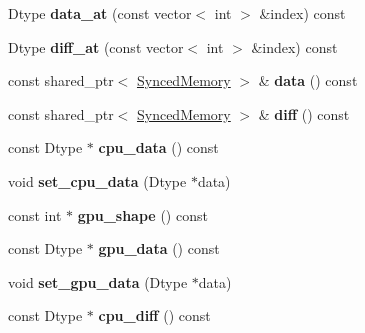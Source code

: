 \begin{DoxyCompactItemize}
\item 
Dtype {\bfseries data\+\_\+at} (const vector$<$ int $>$ \&index) const \hypertarget{classcaffe_1_1Blob_a85a566849633e35492a3dc41d9551731}{}\label{classcaffe_1_1Blob_a85a566849633e35492a3dc41d9551731}

\item 
Dtype {\bfseries diff\+\_\+at} (const vector$<$ int $>$ \&index) const \hypertarget{classcaffe_1_1Blob_ab783abf65ca66df623a8a373de65209b}{}\label{classcaffe_1_1Blob_ab783abf65ca66df623a8a373de65209b}

\item 
const shared\+\_\+ptr$<$ \hyperlink{classcaffe_1_1SyncedMemory}{Synced\+Memory} $>$ \& {\bfseries data} () const \hypertarget{classcaffe_1_1Blob_a09d1435056f21ba9df52cee4d6371087}{}\label{classcaffe_1_1Blob_a09d1435056f21ba9df52cee4d6371087}

\item 
const shared\+\_\+ptr$<$ \hyperlink{classcaffe_1_1SyncedMemory}{Synced\+Memory} $>$ \& {\bfseries diff} () const \hypertarget{classcaffe_1_1Blob_ab7a8c2034a34695fe5f777ff3271e80d}{}\label{classcaffe_1_1Blob_ab7a8c2034a34695fe5f777ff3271e80d}

\item 
const Dtype $\ast$ {\bfseries cpu\+\_\+data} () const \hypertarget{classcaffe_1_1Blob_a490e0b609d0d62dbfc317cbe76aa8fa2}{}\label{classcaffe_1_1Blob_a490e0b609d0d62dbfc317cbe76aa8fa2}

\item 
void {\bfseries set\+\_\+cpu\+\_\+data} (Dtype $\ast$data)\hypertarget{classcaffe_1_1Blob_a5d7d38b157e43ff6a8b8bf94b6815daf}{}\label{classcaffe_1_1Blob_a5d7d38b157e43ff6a8b8bf94b6815daf}

\item 
const int $\ast$ {\bfseries gpu\+\_\+shape} () const \hypertarget{classcaffe_1_1Blob_a16e82cd29e919b116cc8e08af451ab11}{}\label{classcaffe_1_1Blob_a16e82cd29e919b116cc8e08af451ab11}

\item 
const Dtype $\ast$ {\bfseries gpu\+\_\+data} () const \hypertarget{classcaffe_1_1Blob_afd60f6fa2044997149075817991bfc19}{}\label{classcaffe_1_1Blob_afd60f6fa2044997149075817991bfc19}

\item 
void {\bfseries set\+\_\+gpu\+\_\+data} (Dtype $\ast$data)\hypertarget{classcaffe_1_1Blob_ad350de479e172e963f02e8332c800bb7}{}\label{classcaffe_1_1Blob_ad350de479e172e963f02e8332c800bb7}

\item 
const Dtype $\ast$ {\bfseries cpu\+\_\+diff} () const \hypertarget{classcaffe_1_1Blob_a59dc87d97e8a0db8302b142eacb64e10}{}\label{classcaffe_1_1Blob_a59dc87d97e8a0db8302b142eacb64e10}


\end{DoxyCompactItemize}
